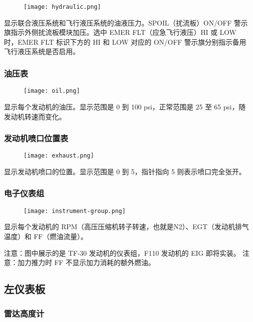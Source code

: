 \begin{figure}[htb]
	\centering
	\texttt{[image: hydraulic.png]}
\end{figure}
显示联合液压系统和飞行液压系统的油液压力。SPOIL（扰流板）ON/OFF 警示旗指示外侧扰流板模块加压。选中 EMER FLT（应急飞行液压）HI 或 LOW 时，EMER FLT 标识下方的 HI 和 LOW 对应的 ON/OFF 警示旗分别指示备用飞行液压系统是否启用。

\subsubsection{油压表}

\begin{figure}[htb]
	\centering
	\texttt{[image: oil.png]}
\end{figure}
显示每个发动机的油压。显示范围是 0 到 100 psi，正常范围是 25 至 65 psi，随发动机转速而变化。

\subsubsection{发动机喷口位置表}

\begin{figure}[htb]
	\centering
	\texttt{[image: exhaust.png]}
\end{figure}
显示发动机喷口的位置。显示范围是 0 到 5，指针指向 5 则表示喷口完全张开。

\subsubsection{电子仪表组}

\begin{figure}[htb]
	\centering
	\texttt{[image: instrument-group.png]}
\end{figure}
显示每个发动机的 RPM（高压压缩机转子转速，也就是N2）、EGT（发动机排气温度）和 FF（燃油流量）。

注意：图中展示的是 TF-30 发动机的仪表组，F110 发动机的 EIG 即将实装。
注意：加力推力时 FF 不显示加力消耗的额外燃油。

\subsection{左仪表板}

\subsubsection{雷达高度计}

